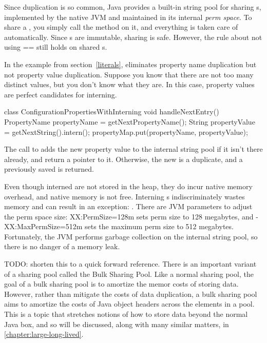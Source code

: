  Since  duplication is so common, Java provides a built-in string
 pool for sharing s, implemented by the native JVM and maintained in
 its internal \emph{perm space}. To share a , you simply call the
 method  on it, and everything is taken care of automatically.
Since s are immutable, sharing is safe. However, the rule about
not using == still holds on shared s.
  
In the example from section~\ref{literals},
 eliminates property
name duplication but not
property value duplication. Suppose you know that there are
not too many distinct values, but you don't know what they are. In this case,
property values are perfect candidates for interning.
\begin{shortlisting}
 
 class ConfigurationPropertiesWithInterning {
    void handleNextEntry() {
       PropertyName propertyName = getNextPropertyName(); 
       String propertyValue = getNextString().intern();
       propertyMap.put(propertyName, propertyValue);
    }
}
\end{shortlisting}

The call to  adds the new property value 
 to the internal string
pool if it isn't there already, and return a pointer to it. Otherwise, the
new  is a duplicate, and a previously saved  is
returned.

Even though interned  are not stored in the heap, they do incur
native memory overhead, and native memory is not free.
 Interning s indiscriminately wastes memory and can result in an
 exception: . 
There are JVM parameters to adjust the perm space size:
XX:PermSize=128m sets perm size to 128 megabytes, and -XX:MaxPermSize=512m sets
the maximum perm size to 512 megabytes. Fortunately, the JVM performs garbage
collection on the internal string pool, so there is no danger of a memory leak.

TODO: shorten this to a quick forward reference. There is an
important variant of a sharing pool called the Bulk Sharing Pool. Like a normal sharing pool, the goal of a bulk sharing pool is to amortize the
memor costs of storing data. However, rather than mitigate the costs of data
duplication, a bulk sharing pool aims to amortize the costs of Java object
headers across the elements in a pool. This is a topic that stretches notions of
how to store data beyond the normal Java box, and so will be discussed, along
with many similar matters, in \autoref{chapter:large-long-lived}.

